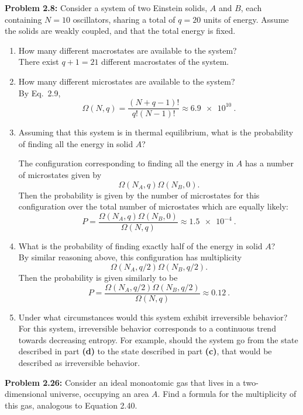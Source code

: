 \documentclass[a4paper, 12pt]{config/homework}
\begin{document}
\pagebreak\noindent
\textbf{Problem 2.8:} Consider a system of two Einstein solids, \(A\) and \(B\), each containing \(N=10\) oscillators, sharing a total of \(q=20\) units of energy. Assume the solids are weakly coupled, and that the total energy is fixed.
\begin{enumerate}[label=\textbf{(\alph*)}]
\item How many different macrostates are available to the system?\\\noindent
There exist \(q+1=21\) different macrostates of the system.

\item How many different microstates are available to the system?\\\noindent
By Eq.\ 2.9,
\[\Omega(N,q)=\frac{(N+q-1)!}{q!(N-1)!}\approx\qty{6.9e10}{}.\]


\item Assuming that this system is in thermal equilibrium, what is the probability of finding all the energy in solid \(A\)?\\
\bigskip\noindent

The configuration corresponding to finding all the energy in \(A\) has a number of microstates given by
\[\Omega(N_A,q)\Omega(N_B,0).\]
Then the probability is given by the number of microstates for this configuration over the total number of microstates which are equally likely:
\[P = \frac{\Omega(N_A,q)\Omega(N_B,0)}{\Omega(N,q)} \approx \qty{1.5e-4}{}.\]


\item What is the probability of finding exactly half of the energy in solid \(A\)?\\\noindent
By similar reasoning above, this configuration has multiplicity
\[\Omega(N_A,q/2)\Omega(N_B,q/2).\]
Then the probability is given similarly to be
\[P = \frac{\Omega(N_A,q/2)\Omega(N_B,q/2)}{\Omega(N,q)}\approx\qty{0.12}{}.\]


\item Under what circumstances would this system exhibit irreversible behavior? \\\noindent
For this system, irreversible behavior corresponds to a continuous trend towards decreasing entropy. For example, should the system go from the state described in part \textbf{(d)} to the state described in part \textbf{(c)}, that would be described as irreversible behavior.


\end{enumerate}
\pagebreak\noindent
\textbf{Problem 2.26:} Consider an ideal monoatomic gas that lives in a two-dimensional universe, occupying an area \(A\). Find a formula for the multiplicity of this gas, analogous to Equation 2.40. \\ \noindent
\end{document}
